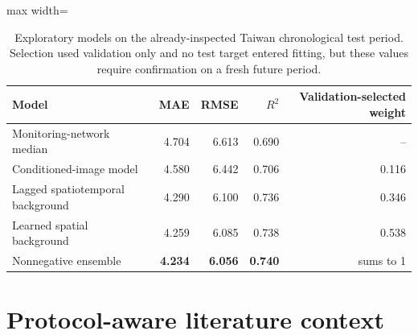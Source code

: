 \documentclass[review,12pt,authoryear]{elsarticle}
\newcommand{\Rtwo}{\ensuremath{R^2}}
\begin{document}
\begin{table}[H]
\centering
\caption{Exploratory models on the already-inspected Taiwan chronological test
period. Selection used validation only and no test target entered fitting, but
these values require confirmation on a fresh future period.}
\label{tab:taiwan-exploratory}
\begin{adjustbox}{max width=\textwidth}
\begin{tabular}{lrrrr}
\toprule
Model & MAE & RMSE & \Rtwo & Validation-selected weight \\
\midrule
Monitoring-network median & 4.704 & 6.613 & 0.690 & -- \\
Conditioned-image model & 4.580 & 6.442 & 0.706 & 0.116 \\
Lagged spatiotemporal background & 4.290 & 6.100 & 0.736 & 0.346 \\
Learned spatial background & 4.259 & 6.085 & 0.738 & 0.538 \\
Nonnegative ensemble & \textbf{4.234} & \textbf{6.056} & \textbf{0.740} & sums to 1 \\
\bottomrule
\end{tabular}
\end{adjustbox}
\end{table}

\section{Protocol-aware literature context}
\end{document}
